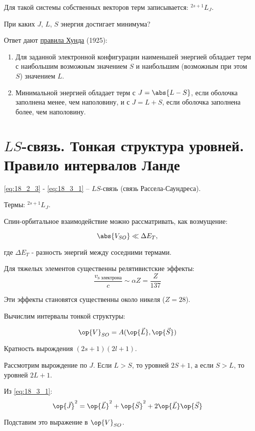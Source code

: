Для такой системы собственных векторов терм записывается: $\boxed{^{2s+1}L_J}$. 

При каких $J$, $L$, $S$ энергия достигает минимума?

Ответ дают \underline{правила Хунда} (1925):

\begin{enumerate}
\item Для заданной электронной конфигурации наименьшей энергией обладает терм с наибольшим возможным значением $S$ и наибольшим (возможным при этом $S$) значением $L$.
\item Минимальной энергией обладает терм с $J = \abs{L-S}$, если оболочка заполнена менее, чем наполовину, и с $J = L + S$, если оболочка заполнена более, чем наполовину.
\end{enumerate}

\section{$LS$-связь. Тонкая структура уровней. Правило интервалов Ланде}

\eqref{eq:18_2_3} - \eqref{eq:18_3_1} -- $LS$-связь (связь Рассела-Саундреса).

Термы: $^{2s+1}L_J$.

Спин-орбитальное взаимодействие можно рассматривать, как возмущение:

\begin{equation}
\label{eq:18_4_1}
\abs{V_{SO}} \ll \Delta E_T,
\end{equation}

 где $\Delta E_T$ - разность энергий между соседними термами.
 
Для тяжелых элементов существенны релятивистские эффекты:
$$
\frac{v_{\text{s электрона}}}{c} \sim \alpha Z = \frac{Z}{137}
$$

Эти эффекты становятся существенны около никеля ($Z = 28$).

Вычислим интервалы тонкой структуры:

$$
\op{V}_{SO} = A(\op{\vec{L}}, \op{\vec{S}})
$$

Кратность вырождения $(2s + 1)(2l+1)$. 

Рассмотрим вырождение по $J$. Если $L > S$, то уровней $2S+1$, а если $S> L$, то уровней $2L+1$.

Из \eqref{eq:18_3_1}:
$$
\op{\vec{J}}^2 = \op{\vec{L}}^2 + \op{\vec{S}}^2 + 2\op{\vec{L}}\op{\vec{S}}
$$

Подставим это выражение в $\op{V}_{SO}$.

